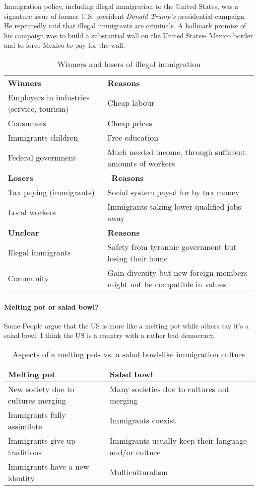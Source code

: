 \documentclass[10pt]{article}
\begin{document}
Immigration policy, including illegal immigration to the United States, was a signature issue of former
U.S. president \emph{Donald Trump's} presidential campaign. He repeatedly said that illegal immigrants are
criminals. A hallmark promise of his campaign was to build a substantial wall on the United States-
Mexico border and to force Mexico to pay for the wall.

\begin{table}[htbp]
	\centering
	\begin{tabularx}{\textwidth}{X|X}
		\hline
		{\sffamily\bfseries Winners} & {\sffamily\bfseries Reasons}\\
		Employers in industries (service, tourism) & Cheap labour \\
		Consumers & Cheap prices \\
		Immigrants children & Free education \\
		Federal government & Much needed income, through sufficient amounts of workers \\ \hline
		{\sffamily\bfseries Losers} & \ {\sffamily\bfseries Reasons}\\
		Tax paying (immigrants) & Social system payed for by tax money \\
		Local workers & Immigrants taking lower qualified jobs away \\ \hline
		{\sffamily\bfseries Unclear} & {\sffamily\bfseries Reasons}\\
		Illegal immigrants & Safety from tyrannic government but losing their home\\
		Community & Gain diversity but new foreign members might not be compatible in values \\ \hline
	\end{tabularx}
	\caption{Winners and losers of illegal immigration}
	\label{tab:my_label}
\end{table}
\paragraph{Melting pot or salad bowl?} Some People argue that the US is more like a melting pot while others say it's a salad bowl.
I think the US is a country with a rather bad democracy.
\begin{table}[htbp]
	\centering
	\begin{tabularx}{\textwidth}{X X}
		\hline
		{\sffamily\bfseries Melting pot} & {\sffamily\bfseries Salad bowl} \\ \hline
		New society due to cultures merging & Many societies due to cultures not merging \\
		Immigrants fully assimilate & Immigrants coexist \\
		Immigrants give up traditions & Immigrants usually keep their language and/or culture \\
		Immigrants have a new identity & Multiculturalism \\ \hline
	\end{tabularx}
	\caption{Aspects of a melting pot- vs. a salad bowl-like immigration culture}
	\label{tab:usa@meltingpot}
\end{table}
\newpage
\end{document}
